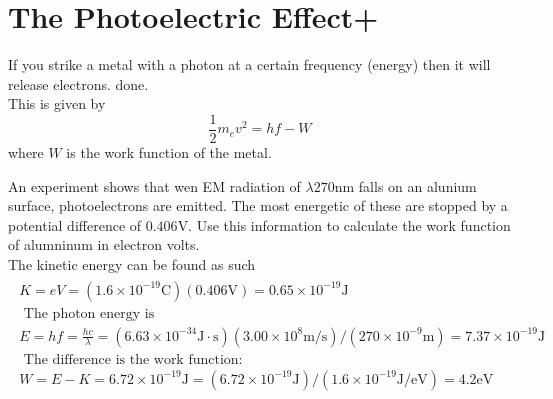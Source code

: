 \section{The Photoelectric Effect+}
If you strike a metal with a photon at a certain frequency (energy) then it will release electrons. done. \\
This is given by 
\[ \frac{1}{2} m_e v^2 = hf - W \]
where $ W $ is the work function of the metal. 
\begin{example}
	An experiment shows that wen EM radiation of $ \lambda 270$nm falls on an alunium surface, photoelectrons are emitted. The most energetic of these are stopped by a potential difference of $ 0.406 $V. Use this information to calculate the work function of alumninum in electron volts. \\
	The kinetic energy can be found as such
	\begin{align*}
	\begin{array} { c } { K = e V = \left( 1.6 \times 10 ^ { - 19 } \mathrm { C } \right) ( 0.406 \mathrm { V } ) = 0.65 \times 10 ^ { - 19 } \mathrm { J } } \\ { \text { The photon energy is } } \\ { E = h f = \frac { h c } { \lambda } = \left( 6.63 \times 10 ^ { - 34 } \mathrm { J } \cdot \mathrm { s } \right) \left( 3.00 \times 10 ^ { 8 } \mathrm { m } / \mathrm { s } \right) / \left( 270 \times 10 ^ { - 9 } \mathrm { m } \right) = 7.37 \times 10 ^ { - 19 } \mathrm { J } } \\ { \text { The difference is the work function: } } \\ { W = E - K = 6.72 \times 10 ^ { - 19 } \mathrm { J } = \left( 6.72 \times 10 ^ { - 19 } \mathrm { J } \right) / \left( 1.6 \times 10 ^ { - 19 } \mathrm { J } / \mathrm { eV } \right) = 4.2 \mathrm { eV } } 
	\end{array}
	\end{align*} 
\end{example}

